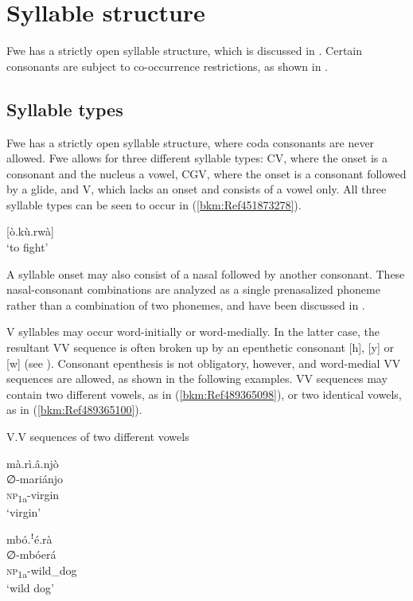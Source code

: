 \section{Syllable structure}
\hypertarget{Toc75352608}{}
Fwe has a strictly open syllable structure, which is discussed in . Certain consonants are subject to co-occurrence restrictions, as shown in .

\subsection{Syllable types}
\label{bkm:Ref451875134}\hypertarget{Toc75352609}{}
Fwe has a strictly open syllable structure, where coda consonants are never allowed. Fwe allows for three different syllable types: CV, where the onset is a consonant and the nucleus a vowel, CGV, where the onset is a consonant followed by a glide, and V, which lacks an onset and con\-sists of a vowel only. All three syllable types can be seen to occur in (\ref{bkm:Ref451873278}).

\ea
\label{bkm:Ref451873278}
  [ò.kù.rwà]\\
\glt ‘to fight’
\z

A syllable onset may also consist of a nasal followed by another consonant. These nasal-conso\-nant combinations are analyzed as a single prenasalized pho\-neme rather than a combination of two phonemes, and have been discussed in .

V syllables may occur word-initially or word-medially. In the latter case, the resultant VV se\-quence is often broken up by an epenthetic consonant [h], [y] or [w] (see ). Consonant epenthesis is not obligatory, however, and word-medial VV sequences are allowed, as shown in the following examples. VV sequences may contain two different vowels, as in (\ref{bkm:Ref489365098}), or two identical vowels, as in (\ref{bkm:Ref489365100}).

\newpage
\ea
\label{bkm:Ref489365098}
  V.V sequences of two different vowels

\ea
\glll mà.rì.â.njò\\
∅-mariánjo\\
\textsc{np}\textsubscript{1a}-virgin\\
\glt ‘virgin’

\ex
\glll mbó.ꜝé.rà\\
∅-mbóerá\\
\textsc{np}\textsubscript{1a}-wild\_dog\\
\glt ‘wild dog’

